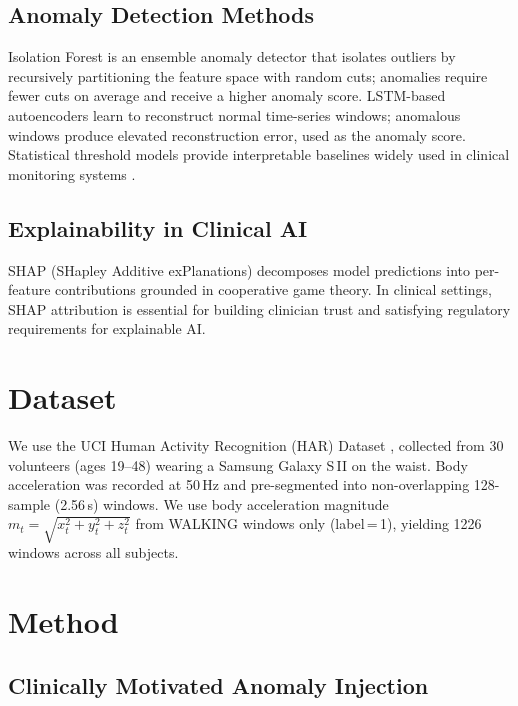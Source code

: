 \documentclass[conference]{IEEEtran}
\begin{document}
\subsection{Anomaly Detection Methods}
Isolation Forest \cite{liu2008} is an ensemble anomaly detector that
isolates outliers by recursively partitioning the feature space with
random cuts; anomalies require fewer cuts on average and receive a higher
anomaly score.
LSTM-based autoencoders \cite{malhotra2016} learn to reconstruct normal
time-series windows; anomalous windows produce elevated reconstruction
error, used as the anomaly score.
Statistical threshold models provide interpretable baselines widely used
in clinical monitoring systems \cite{bourke2007}.

\subsection{Explainability in Clinical AI}
SHAP (SHapley Additive exPlanations) \cite{lundberg2017} decomposes
model predictions into per-feature contributions grounded in cooperative
game theory.
In clinical settings, SHAP attribution is essential for building
clinician trust and satisfying regulatory requirements for explainable AI.

\section{Dataset}

We use the UCI Human Activity Recognition (HAR) Dataset
\cite{anguita2013}, collected from 30 volunteers (ages 19–48)
wearing a Samsung Galaxy S\,II on the waist.
Body acceleration was recorded at 50\,Hz and pre-segmented into
non-overlapping 128-sample (2.56\,s) windows.
We use body acceleration magnitude
$m_t = \sqrt{x_t^2 + y_t^2 + z_t^2}$
from WALKING windows only (label\,=\,1), yielding 1226 windows across
all subjects.

\section{Method}

\subsection{Clinically Motivated Anomaly Injection}
\end{document}
